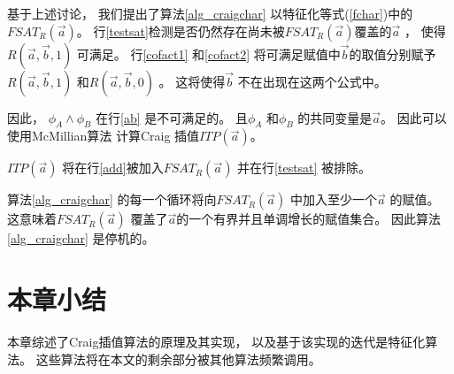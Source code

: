 基于上述讨论，
我们提出了算法\ref{alg_craigchar} 以特征化等式(\ref{fchar})中的$FSAT_R(\vec{a})$。
行\ref{testsat}检测是否仍然存在尚未被$FSAT_R(\vec{a})$覆盖的$\vec{a}$ ，
使得$R(\vec{a},\vec{b},1)$ 可满足。
行\ref{cofact1} 和\ref{cofact2} 将可满足赋值中$\vec{b}$的取值分别赋予
$R(\vec{a},\vec{b},1)$ 和$R(\vec{a},\vec{b},0)$ 。
这将使得$\vec{b}$ 不在出现在这两个公式中。

因此，
$\phi_A\wedge \phi_B$ 在行\ref{ab} 是不可满足的。
且$\phi_A$ 和$\phi_B$ 的共同变量是$\vec{a}$。
因此可以使用McMillian算法 计算Craig 插值$ITP(\vec{a})$。

$ITP(\vec{a})$ 将在行\ref{add}被加入$FSAT_R(\vec{a})$  并在行\ref{testsat} 被排除。

算法\ref{alg_craigchar} 的每一个循环将向$FSAT_R(\vec{a})$ 中加入至少一个$\vec{a}$ 的赋值。
这意味着$FSAT_R(\vec{a})$ 覆盖了$\vec{a}$的一个有界并且单调增长的赋值集合。
因此算法\ref{alg_craigchar} 是停机的。

\section{本章小结}
本章综述了Craig插值算法的原理及其实现，
以及基于该实现的迭代是特征化算法。
这些算法将在本文的剩余部分被其他算法频繁调用。


